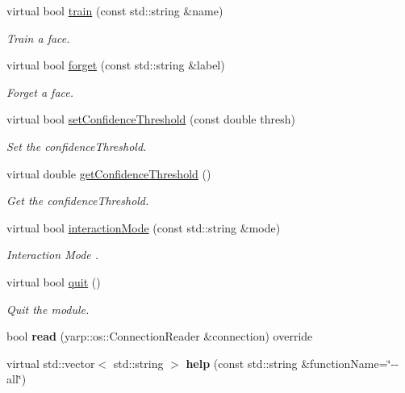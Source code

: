 \begin{DoxyCompactItemize}
\item 
virtual bool \hyperlink{classrecognition__IDL_acf63e73eba86bdffa4620aa4240ed17f}{train} (const std\+::string \&name)
\begin{DoxyCompactList}\small\item\em Train a face. \end{DoxyCompactList}\item 
virtual bool \hyperlink{classrecognition__IDL_a5ddaf7e807d0bb5685ee4b87e8817bf3}{forget} (const std\+::string \&label)
\begin{DoxyCompactList}\small\item\em Forget a face. \end{DoxyCompactList}\item 
virtual bool \hyperlink{classrecognition__IDL_ab4ab3c0a86b630b85e411ff39720fc3d}{set\+Confidence\+Threshold} (const double thresh)
\begin{DoxyCompactList}\small\item\em Set the confidence\+Threshold. \end{DoxyCompactList}\item 
virtual double \hyperlink{classrecognition__IDL_a5cc457fe6b185acc8a4b1f541a002cee}{get\+Confidence\+Threshold} ()
\begin{DoxyCompactList}\small\item\em Get the confidence\+Threshold. \end{DoxyCompactList}\item 
virtual bool \hyperlink{classrecognition__IDL_afb70498b2cf99712cfad0e19d171dcab}{interaction\+Mode} (const std\+::string \&mode)
\begin{DoxyCompactList}\small\item\em Interaction Mode . \end{DoxyCompactList}\item 
virtual bool \hyperlink{classrecognition__IDL_a42d5f63c8461c081cf2c17311bed5375}{quit} ()
\begin{DoxyCompactList}\small\item\em Quit the module. \end{DoxyCompactList}\item 
\mbox{\label{classrecognition__IDL_a4dee551f9609961d691081cd6dcd352f}} 
bool {\bfseries read} (yarp\+::os\+::\+Connection\+Reader \&connection) override
\item 
\mbox{\label{classrecognition__IDL_aeb060873c369bd091441e56dcdac7964}} 
virtual std\+::vector$<$ std\+::string $>$ {\bfseries help} (const std\+::string \&function\+Name=\char`\"{}-\/-\/all\char`\"{})
\end{DoxyCompactItemize}


